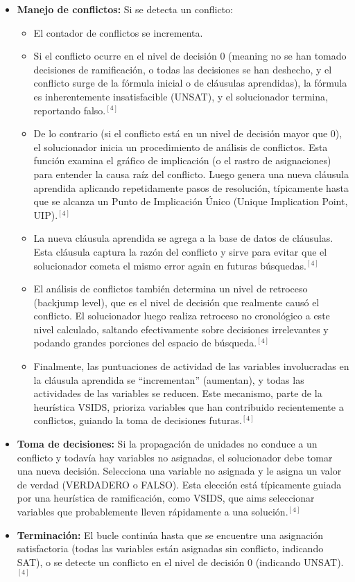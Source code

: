 \documentclass{article}
\begin{document}
\begin{itemize}
\item \textbf{Manejo de conflictos:}
Si se detecta un conflicto:
\begin{itemize}
\item El contador de conflictos se incrementa.
\item Si el conflicto ocurre en el nivel de decisión 0 (meaning no se han tomado decisiones de ramificación, o todas las decisiones se han deshecho, y el conflicto surge de la fórmula inicial o de cláusulas aprendidas), la fórmula es inherentemente insatisfacible (UNSAT), y el solucionador termina, reportando falso.$^{[4]}$
\item De lo contrario (si el conflicto está en un nivel de decisión mayor que 0), el solucionador inicia un procedimiento de análisis de conflictos. Esta función examina el gráfico de implicación (o el rastro de asignaciones) para entender la causa raíz del conflicto. Luego genera una nueva cláusula aprendida aplicando repetidamente pasos de resolución, típicamente hasta que se alcanza un Punto de Implicación Único (Unique Implication Point, UIP).$^{[4]}$
\item La nueva cláusula aprendida se agrega a la base de datos de cláusulas. Esta cláusula captura la razón del conflicto y sirve para evitar que el solucionador cometa el mismo error again en futuras búsquedas.$^{[4]}$
\item El análisis de conflictos también determina un nivel de retroceso (backjump level), que es el nivel de decisión que realmente causó el conflicto. El solucionador luego realiza retroceso no cronológico a este nivel calculado, saltando efectivamente sobre decisiones irrelevantes y podando grandes porciones del espacio de búsqueda.$^{[4]}$
\item Finalmente, las puntuaciones de actividad de las variables involucradas en la cláusula aprendida se ``incrementan'' (aumentan), y todas las actividades de las variables se reducen. Este mecanismo, parte de la heurística VSIDS, prioriza variables que han contribuido recientemente a conflictos, guiando la toma de decisiones futuras.$^{[4]}$
\end{itemize}

\item \textbf{Toma de decisiones:} Si la propagación de unidades no conduce a un conflicto y todavía hay variables no asignadas, el solucionador debe tomar una nueva decisión. Selecciona una variable no asignada y le asigna un valor de verdad (VERDADERO o FALSO). Esta elección está típicamente guiada por una heurística de ramificación, como VSIDS, que aims seleccionar variables que probablemente lleven rápidamente a una solución.$^{[4]}$

\item \textbf{Terminación:} El bucle continúa hasta que se encuentre una asignación satisfactoria (todas las variables están asignadas sin conflicto, indicando SAT), o se detecte un conflicto en el nivel de decisión 0 (indicando UNSAT).$^{[4]}$
\end{itemize}
\end{document}
